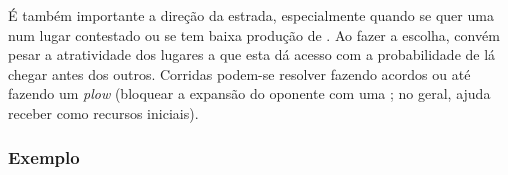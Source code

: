 \documentclass[12pt]{article}
\begin{document}
É também importante a direção da estrada, especialmente quando se quer uma  num lugar contestado ou se tem baixa produção de . 
Ao fazer a escolha, convém pesar a atratividade dos lugares a que esta dá acesso com a probabilidade de lá chegar antes dos outros.
Corridas podem-se resolver fazendo acordos ou até fazendo um \textit{plow} (bloquear a expansão do oponente com uma ; no geral, ajuda receber  como recursos iniciais).

\vspace{-0.1cm}
\subsubsection{Exemplo}
\end{document}
